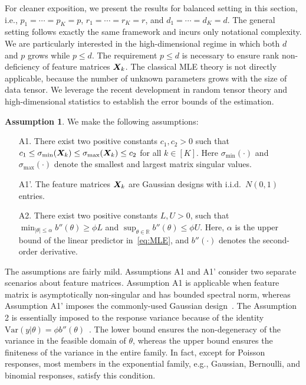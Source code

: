 \documentclass[12pt]{article}
\theoremstyle{definition}
\theoremstyle{definition}
\newtheorem{assumption}{Assumption}
\begin{document}
For cleaner exposition, we present the results for balanced setting in this section, i.e., $p_1=\cdots=p_K=p$, $r_1=\cdots=r_K=r$, and $d_1=\cdots=d_K=d$. The general setting follows exactly the same framework and incurs only notational complexity. We are particularly interested in the high-dimensional regime in which both $d$ and $p$ grows while $p\leq d$. {\color{blue}The requirement $p\leq d$ is necessary to ensure rank non-deficiency of  feature matrices $\bm X_k$.} The classical MLE theory is not directly applicable, because the number of unknown parameters grows with the size of data tensor. We leverage the recent development in random tensor theory and high-dimensional statistics to establish the error bounds of the estimation. 


\begin{assumption}\label{ass}We make the following assumptions:
\begin{enumerate}[noitemsep,topsep=0pt]
\item [A1.] There exist two positive constants $c_1, c_2>0$ such that $c_1\leq \sigma_{\min}(\bm X_k)\leq  \sigma_{\max}(\bm X_k)\leq c_2$ for all $k\in[K]$. Here $\sigma_{\min}(\cdot)$ and $\sigma_{\max}(\cdot)$ denote the smallest and largest matrix singular values.
\item [A1'.] The feature matrices $\bm X_k$ are Gaussian designs with i.i.d.\ $N(0,1)$ entries.
\item [A2.] There exist two positive constants $L, U>0$, such that $\min_{|\theta|\leq \alpha}b''(\theta)\geq \phi L$ and $\sup_{\theta\in \mathbb{R}}b''(\theta)\leq \phi U$. Here, $\alpha$ is the upper bound of the linear predictor in~\eqref{eq:MLE}, and $b''(\cdot)$ denotes the second-order derivative.
\end{enumerate}
\end{assumption}
The assumptions are fairly mild. Assumptions A1 and A1' consider two separate scenarios about feature matrices. Assumption A1 is applicable when feature matrix is asymptotically non-singular and has bounded spectral norm, whereas Assumption A1' imposes the commonly-used Gaussian design~\citep{raskutti2019convex}.  The Assumption 2 is essentially imposed to the response variance because of the identity $\text{Var}(y|\theta)=\phi b''(\theta)$~\citep{mccullagh1989generalized}. The lower bound  ensures the non-degeneracy of the variance in the feasible domain of $\theta$, whereas the upper bound ensures the finiteness of the variance in the entire family. In fact, except for Poisson responses, most members in the exponential family, e.g., Gaussian, Bernoulli, and binomial responses, satisfy this condition. 
\end{document}
